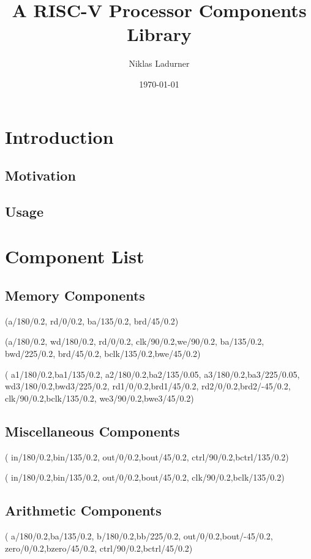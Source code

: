 \documentclass[.52pt,a4paper,titlepage]{article}
\title{A RISC-V Processor Components \Circuitikz{} Library}
\author{Niklas Ladurner}
\date{\today}
\begin{document}
\begin{center}
	\LARGE \textbf{\thetitle}

	\normalsize \thedate
\end{center}

\tableofcontents

\section{Introduction}
\subsection{Motivation}
\subsection{Usage}

\newpage
\section{Component List}
\subsection{Memory Components}
(a/180/0.2, rd/0/0.2, ba/135/0.2, brd/45/0.2)

(a/180/0.2, wd/180/0.2, rd/0/0.2, clk/90/0.2,we/90/0.2, ba/135/0.2, bwd/225/0.2, brd/45/0.2, bclk/135/0.2,bwe/45/0.2)

(
a1/180/0.2,ba1/135/0.2,
a2/180/0.2,ba2/135/0.05,
a3/180/0.2,ba3/225/0.05,
wd3/180/0.2,bwd3/225/0.2,
rd1/0/0.2,brd1/45/0.2,
rd2/0/0.2,brd2/-45/0.2,
clk/90/0.2,bclk/135/0.2,
we3/90/0.2,bwe3/45/0.2)

\subsection{Miscellaneous Components}
(
in/180/0.2,bin/135/0.2,
out/0/0.2,bout/45/0.2,
ctrl/90/0.2,bctrl/135/0.2)

(
in/180/0.2,bin/135/0.2,
out/0/0.2,bout/45/0.2,
clk/90/0.2,bclk/135/0.2)

\subsection{Arithmetic Components}
(
a/180/0.2,ba/135/0.2,
b/180/0.2,bb/225/0.2,
out/0/0.2,bout/-45/0.2,
zero/0/0.2,bzero/45/0.2,
ctrl/90/0.2,bctrl/45/0.2)
\end{document}
